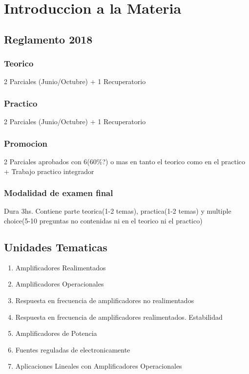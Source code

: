 \chapter*{Introduccion a la Materia}

\section*{Reglamento 2018}
\subsection*{Teorico}
2 Parciales (Junio/Octubre) + 1 Recuperatorio

\subsection*{Practico}
2 Parciales (Junio/Octubre) + 1 Recuperatorio

\subsection*{Promocion}
2 Parciales aprobados con 6(60\%?) o mas en tanto el teorico como en el 
practico + Trabajo practico integrador

\subsection*{Modalidad de examen final}
Dura 3hs. Contiene parte teorica(1-2 temas), practica(1-2 temas) y multiple 
choice(5-10 preguntas no contenidas ni en el teorico ni el practico)

\section*{Unidades Tematicas}
\begin{enumerate}
	\item Amplificadores Realimentados
	\item Amplificadores Operacionales
  \item Respuesta en frecuencia de amplificadores no realimentados
  \item Respuesta en frecuencia de amplificadores realimentados. Estabilidad
  \item Amplificadores de Potencia
  \item Fuentes reguladas de electronicamente
  \item Aplicaciones Lineales con Amplificadores Operacionales
\end{enumerate}
